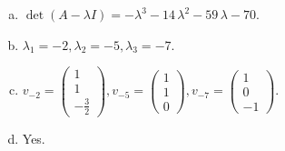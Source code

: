 \begin{questions}
\begin{solution}
\begin{enumerate}[(a)]
\item $\det(A-\lambda I)=-{\lambda}^{3} - 14 \, {\lambda}^{2} - 59 \, {\lambda} - 70$.
\item ${\lambda}_1=-2, {\lambda}_2=-5, {\lambda}_3=-7$.
\item $v_{-2}=\left(\begin{array}{r}
1 \\
1 \\
-\frac{3}{2}
\end{array}\right), v_{-5}=\left(\begin{array}{r}
1 \\
1 \\
0
\end{array}\right), v_{-7}=\left(\begin{array}{r}
1 \\
0 \\
-1
\end{array}\right)$.
\item Yes.
\end{enumerate}
\end{solution}

\end{questions}

\newpage


\begin{center}
\end{center}

